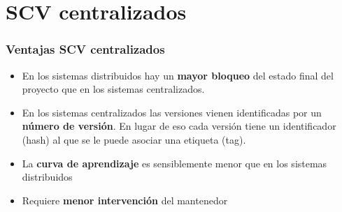 \section*{SCV centralizados}
\frame
{
\frametitle{Ventajas SCV centralizados}
\begin{itemize}
\item En los sistemas distribuidos hay un \textbf{mayor bloqueo} del estado final del proyecto que en los sistemas centralizados.
\item En los sistemas centralizados las versiones vienen identificadas por un \textbf{número de versión}. En lugar de eso cada versión tiene un identificador (hash) al que se le puede asociar una etiqueta (tag).
\item La \textbf{curva de aprendizaje} es sensiblemente menor que en los sistemas distribuidos
\item Requiere \textbf{menor intervención} del mantenedor
\end{itemize}
}
